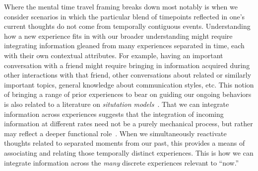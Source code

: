 \documentclass{article}
\begin{document}
Where the mental time travel framing breaks down most notably is when we consider scenarios in which the particular blend of timepoints reflected in one's current thoughts do not come from temporally contiguous events.  Understanding how a new experience fits in with our broader understanding might require integrating information gleaned from many experiences separated in time, each with their own contextual attributes.  For example, having an important conversation with a friend might require bringing in information acquired during other interactions with that friend, other conversations about related or similarly important topics, general knowledge about communication styles, etc.  This notion of bringing a range of prior experiences to bear on guiding our ongoing behaviors is also related to a literature on \textit{situtation models}~\citep[for review see][]{RangRitc12}.  That we can integrate information across experiences suggests that the integration of incoming information at different rates need not be a purely mechanical process, but rather may reflect a deeper functional role~\citep[also see][]{BrigEtal18}.  When we simultaneously reactivate thoughts related to separated moments from our past, this provides a means of associating and relating those temporally distinct experiences.  This is how we can integrate information across the \textit{many} discrete experiences relevant to ``now.''
\end{document}
